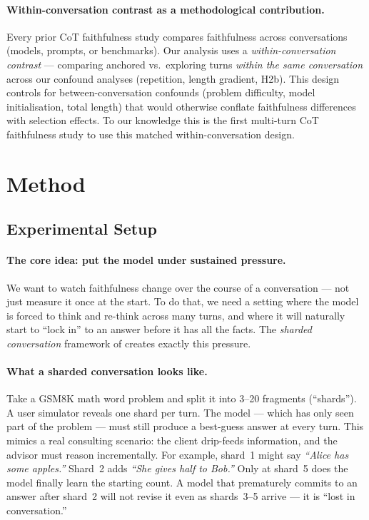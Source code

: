 \documentclass{article}
\begin{document}
\paragraph{Within-conversation contrast as a methodological contribution.}
Every prior CoT faithfulness study compares faithfulness across
conversations (models, prompts, or benchmarks).
Our analysis uses a \emph{within-conversation contrast} ---
comparing anchored vs.\ exploring turns \emph{within the same
conversation} across our confound analyses (repetition, length gradient,
H2b).
This design controls for between-conversation confounds (problem
difficulty, model initialisation, total length) that would otherwise
conflate faithfulness differences with selection effects.
To our knowledge this is the first multi-turn CoT faithfulness study
to use this matched within-conversation design.

\section{Method}
\label{sec:method}

\subsection{Experimental Setup}

\paragraph{The core idea: put the model under sustained pressure.}
We want to watch faithfulness change over the course of a
conversation --- not just measure it once at the start.
To do that, we need a setting where the model is forced to
think and re-think across many turns, and where it will naturally
start to ``lock in'' to an answer before it has all the facts.
The \emph{sharded conversation} framework of
\citet{laban2025} creates exactly this pressure.

\paragraph{What a sharded conversation looks like.}
Take a GSM8K math word problem and split it into
3--20 fragments (``shards'').
A user simulator reveals one shard per turn.
The model --- which has only seen part of the problem --- must
still produce a best-guess answer at every turn.
This mimics a real consulting scenario: the client drip-feeds
information, and the advisor must reason incrementally.
For example, shard~1 might say \emph{``Alice has some apples.''}
Shard~2 adds \emph{``She gives half to Bob.''}
Only at shard~5 does the model finally learn the starting count.
A model that prematurely commits to an answer after shard~2
will not revise it even as shards~3--5 arrive --- it is ``lost
in conversation.''
\end{document}
